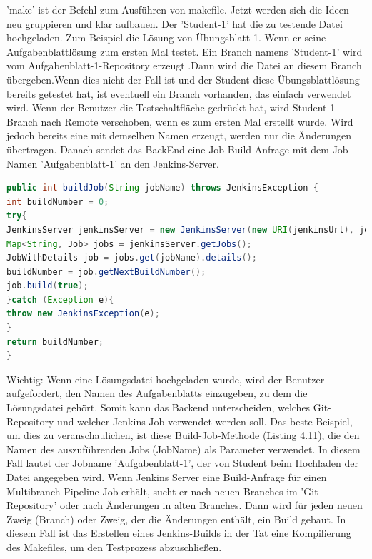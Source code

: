 \documentclass[a4paper,12pt,oneside]{book}
\begin{document}
'make' ist der Befehl zum Ausführen von makefile.
\newline
Jetzt werden sich die Ideen neu gruppieren und klar aufbauen. Der 'Student-1' hat die zu testende Datei hochgeladen. Zum Beispiel die Lösung von Übungsblatt-1. Wenn er seine Aufgabenblattlösung zum ersten Mal testet. Ein Branch namens 'Student-1' wird vom Aufgabenblatt-1-Repository erzeugt .Dann wird die Datei an diesem Branch übergeben.Wenn dies nicht der Fall ist und der Student diese Übungsblattlösung bereits getestet hat, ist eventuell ein Branch vorhanden, das einfach verwendet wird. Wenn der Benutzer die Testschaltfläche gedrückt hat, wird Student-1-Branch nach Remote verschoben, wenn es zum ersten Mal erstellt wurde. Wird jedoch bereits eine mit demselben Namen erzeugt, werden nur die Änderungen übertragen. Danach sendet das BackEnd eine Job-Build Anfrage mit dem Job-Namen 'Aufgabenblatt-1' an den Jenkins-Server. 
\begin{lstlisting}[language=JAVA,caption=Job-Build Anfrage ]
	public int buildJob(String jobName) throws JenkinsException {
int buildNumber = 0;
try{
JenkinsServer jenkinsServer = new JenkinsServer(new URI(jenkinsUrl), jenkinsUser, jenkinsPassword);
Map<String, Job> jobs = jenkinsServer.getJobs();
JobWithDetails job = jobs.get(jobName).details();
buildNumber = job.getNextBuildNumber();
job.build(true);
}catch (Exception e){
throw new JenkinsException(e);
}
return buildNumber;
}
\end{lstlisting} 
Wichtig: Wenn eine Lösungsdatei hochgeladen wurde, wird der Benutzer aufgefordert, den Namen des Aufgabenblatts einzugeben, zu dem die Lösungsdatei gehört. Somit kann das Backend unterscheiden, welches Git-Repository und welcher Jenkins-Job verwendet werden soll. Das beste Beispiel, um dies zu veranschaulichen, ist diese Build-Job-Methode (Listing 4.11), die den Namen des auszuführenden Jobs (JobName) als Parameter verwendet. In diesem Fall lautet der Jobname 'Aufgabenblatt-1', der von Student beim Hochladen der Datei angegeben wird.
\newline
Wenn Jenkins Server eine Build-Anfrage für einen Multibranch-Pipeline-Job erhält, sucht er nach neuen Branches im 'Git-Repository' oder nach Änderungen in alten Branches. Dann wird für jeden neuen Zweig (Branch) oder Zweig, der die Änderungen enthält, ein Build gebaut.
\newline
In diesem Fall ist das Erstellen eines Jenkins-Builds in der Tat eine Kompilierung des Makefiles, um den Testprozess abzuschließen.
\newline
\end{document}
